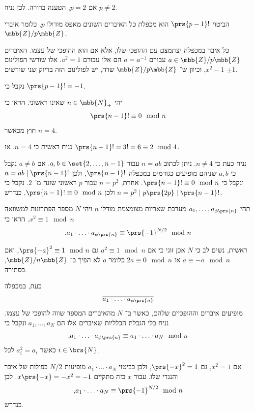 \documentclass[a4paper,10pt,twoside,openany]{book}
\begin{document}
\begin{solution}
אם
$p = 2$,
הטענה ברורה. לכן נניח
$p \neq 2$.

הביטוי
$\prs{p-1}!$
הוא מכפלת כל האיברים השונים מאפס מודולו
$p$,
כלומר איברי
$\mbb{Z} / p\mbb{Z}$.

כל איבר במכפלה יצתמצם עם ההופכי שלו, אלא אם הוא ההופכי של עצמו.
האיברים
$a \in \mbb{Z} / p\mbb{Z}$
עבורם
$a = a^{-1}$
הם אלו עבורם
$a^2 = 1$.
אלו שורשי הפולינום
$x^2 - 1$,
וכיוון ש־%
$\mbb{Z} / p\mbb{Z}$
שדה, יש לפולינום הזה בדיוק שני שורשים
$\pm 1$.

נקבל כי
$\prs{p-1}! = -1$.
\end{solution}

\begin{exercisechap}
יהי
$n \in \mbb{N}_+$
שאינו ראשוני. הראו כי
\[\prs{n-1}! \equiv 0 \mod{n}\]
חוץ מכאשר
$n = 4$.
\end{exercisechap}

\begin{solution}
נניח ראשית כי
$n = 4$.
אז
$\prs{n-1}! = 3! = 6 \equiv 2 \mod{4}$.

נניח כעת כי
$n \neq 4$.
ניתן לכתוב
$n = ab$
עבור
$a,b \in \set{2, \ldots, n-1}$.
אם
$a \neq b$
נקבל כי
$a,b$
שניהם מופיעים כגורמים במכפלה
$\prs{n-1}!$,
ולכן
$n = ab \mid \prs{n-1}!$
ונקבל כי
$\prs{n-1}! \equiv 0 \mod{n}$.
אחרת,
$n = p^2$
עבור
$p$
ראשוני שונה מ־%
$2$.
נקבל כי
$n = p^2 \mid p \prs{2p} \mid \prs{n-1}!$
ולכן
$\prs{n-1}! \equiv 0 \mod{n}$,
כנדרש.
\end{solution}

\begin{exercisechap}
תהי
$a_1, \ldots, a_{\phi\prs{n}}$
מערכת שאריות מצומצמת מודלו
$n$
ויהי
$N$
מספר הפתרונות למשוואה
$x^2 \equiv 1 \mod{n}$.
הראו כי
\[\text{.} a_1 \cdot \ldots \cdot a_{\phi\prs{n}} \equiv \prs{-1}^{N/2} \mod{n}\]
\end{exercisechap}

\begin{solution}
ראשית, נשים לב כי
$N$
אכן זוגי כי אם
$a^2 \equiv 1 \mod{n}$
גם
$\prs{-a}^2 \equiv 1 \mod{n}$,
ואם
$a \equiv -a \mod{n}$
אז
$2a \equiv 0 \mod{n}$
כלומר
$a$
לא הפיך ב־%
$\mbb{Z} / n\mbb{Z}$,
בסתירה.

כעת, במכפלה
\[\overline{a_1 \cdot \ldots \cdot a_{\phi\prs{n}}}\]
מופיעים איברים וההופכיים שלהם, כאשר ב־%
$N$
מהאיברים המספר שווה להופכי של עצמו.
נניח בלי הגבלת הכלליות שאיברים אלו הם
$a_1, \ldots, a_N$
ונקבל כי
\[\text{,} a_1 \cdot \ldots \cdot a_{\phi\prs{n}} \equiv a_1 \cdot \ldots \cdot a_N \mod{n}\]
כאשר
$a_i^2 = a_i$
לכל
$i \in \brs{N}$.

אם
$x^2 = 1$,
גם
$\prs{-x}^2 = 1$,
ולכן בביטוי
$a_1 \cdot \ldots \cdot a_N$
מופיעות
$N/2$
כפולות של איבר והנגדי שלו.
עבור
$x$
כזה מתקיים
$x \prs{-x} = -x^2 = -1$.
לכן
\[\text{,} a_1 \cdot \ldots \cdot a_N \equiv \prs{-1}^{N/2} \mod{n}\]
כנדרש.
\end{solution}
\end{document}
